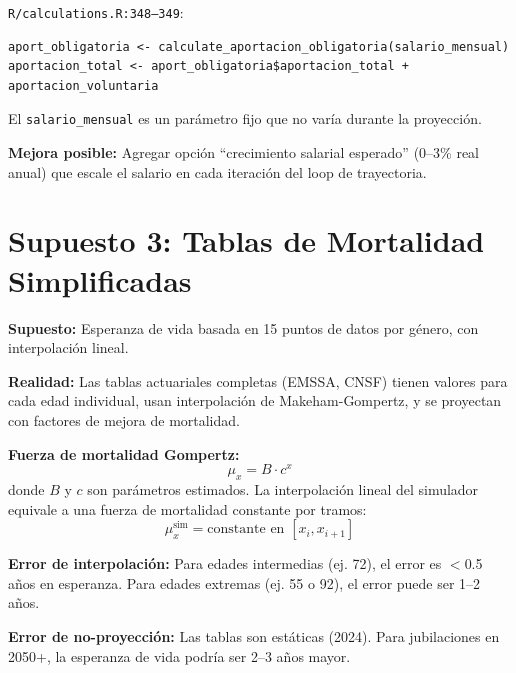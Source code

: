\documentclass[11pt,a4paper]{report}
\begin{document}
\begin{tcolorbox}[colback=orange!5!white, colframe=orange!75!black, title=\textbf{Aplicaci\'on en C\'odigo}]
\texttt{R/calculations.R:348--349}:
\begin{lstlisting}
aport_obligatoria <- calculate_aportacion_obligatoria(salario_mensual)
aportacion_total <- aport_obligatoria$aportacion_total + aportacion_voluntaria
\end{lstlisting}
El \texttt{salario\_mensual} es un par\'ametro fijo que no var\'ia durante la proyecci\'on.

\textbf{Mejora posible:} Agregar opci\'on ``crecimiento salarial esperado'' (0--3\% real anual) que escale el salario en cada iteraci\'on del loop de trayectoria.
\end{tcolorbox}


\section{Supuesto 3: Tablas de Mortalidad Simplificadas}

\begin{tcolorbox}[colback=blue!5!white, colframe=blue!75!black, title=\textbf{Definici\'on Formal}]
\textbf{Supuesto:} Esperanza de vida basada en 15 puntos de datos por g\'enero, con interpolaci\'on lineal.

\textbf{Realidad:} Las tablas actuariales completas (EMSSA, CNSF) tienen valores para cada edad individual, usan interpolaci\'on de Makeham-Gompertz, y se proyectan con factores de mejora de mortalidad.

\textbf{Fuerza de mortalidad Gompertz:}
\[
  \mu_x = B \cdot c^x
\]
donde $B$ y $c$ son par\'ametros estimados. La interpolaci\'on lineal del simulador equivale a una fuerza de mortalidad constante por tramos:
\[
  \mu_x^{\text{sim}} = \text{constante en } [x_i, x_{i+1}]
\]

\textbf{Error de interpolaci\'on:} Para edades intermedias (ej. 72), el error es $<$0.5 a\~nos en esperanza. Para edades extremas (ej. 55 o 92), el error puede ser 1--2 a\~nos.

\textbf{Error de no-proyecci\'on:} Las tablas son est\'aticas (2024). Para jubilaciones en 2050+, la esperanza de vida podr\'ia ser 2--3 a\~nos mayor.
\end{tcolorbox}
\end{document}
